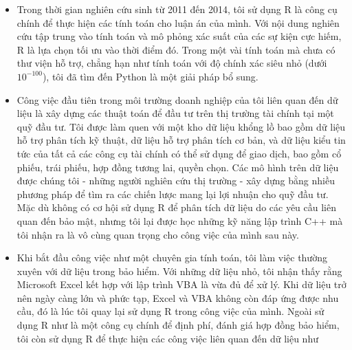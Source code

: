 \documentclass[
]{article}
\begin{document}
\begin{itemize}
\item
  Trong thời gian nghiên cứu sinh từ 2011 đến 2014, tôi sử dụng R là công cụ chính để thực hiện các tính toán cho luận án của mình. Với nội dung nghiên cứu tập trung vào tính toán và mô phỏng xác suất của các sự kiện cực hiếm, R là lựa chọn tối ưu vào thời điểm đó. Trong một vài tính toán mà chưa có thư viện hỗ trợ, chẳng hạn như tính toán với độ chính xác siêu nhỏ (dưới \(10^{-100}\)), tôi đã tìm đến Python là một giải pháp bổ sung.
\item
  Công việc đầu tiên trong môi trường doanh nghiệp của tôi liên quan đến dữ liệu là xây dựng các thuật toán để đầu tư trên thị trường tài chính tại một quỹ đầu tư. Tôi được làm quen với một kho dữ liệu khổng lồ bao gồm dữ liệu hỗ trợ phân tích kỹ thuật, dữ liệu hỗ trợ phân tích cơ bản, và dữ liệu kiểu tin tức của tất cả các công cụ tài chính có thể sử dụng để giao dịch, bao gồm cổ phiếu, trái phiếu, hợp đồng tương lai, quyền chọn. Các mô hình trên dữ liệu được chúng tôi - những người nghiên cứu thị trường - xây dựng bằng nhiều phương pháp để tìm ra các chiến lược mang lại lợi nhuận cho quỹ đầu tư. Mặc dù không có cơ hội sử dụng R để phân tích dữ liệu do các yêu cầu liên quan đến bảo mật, nhưng tôi lại được học những kỹ năng lập trình C++ mà tôi nhận ra là vô cùng quan trọng cho công việc của mình sau này.
\item
  Khi bắt đầu công việc như một chuyên gia tính toán, tôi làm việc thường xuyên với dữ liệu trong bảo hiểm. Với những dữ liệu nhỏ, tôi nhận thấy rằng Microsoft Excel kết hợp với lập trình VBA là vừa đủ để xử lý. Khi dữ liệu trở nên ngày càng lớn và phức tạp, Excel và VBA không còn đáp ứng được nhu cầu, đó là lúc tôi quay lại sử dụng R trong công việc của mình. Ngoài sử dụng R như là một công cụ chính để định phí, đánh giá hợp đồng bảo hiểm, tôi còn sử dụng R để thực hiện các công việc liên quan đến dữ liệu như


\end{itemize}
\end{document}
